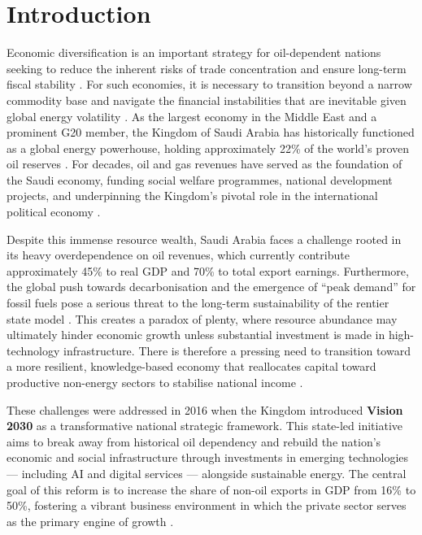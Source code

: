 \documentclass[12pt, a4paper]{article}
\begin{document}
\newpage
\thispagestyle{plain}
\tableofcontents

\newpage

\section{Introduction}

Economic diversification is an important strategy for oil-dependent nations seeking to reduce the inherent risks of trade concentration and ensure long-term fiscal stability \citep{touati2024}. For such economies, it is necessary to transition beyond a narrow commodity base and navigate the financial instabilities that are inevitable given global energy volatility \citep{alroubaie2025}. As the largest economy in the Middle East and a prominent G20 member, the Kingdom of Saudi Arabia has historically functioned as a global energy powerhouse, holding approximately 22\% of the world's proven oil reserves \citep{anser2020}. For decades, oil and gas revenues have served as the foundation of the Saudi economy, funding social welfare programmes, national development projects, and underpinning the Kingdom's pivotal role in the international political economy \citep{sallam2026}.

Despite this immense resource wealth, Saudi Arabia faces a challenge rooted in its heavy overdependence on oil revenues, which currently contribute approximately 45\% to real GDP and 70\% to total export earnings. Furthermore, the global push towards decarbonisation and the emergence of ``peak demand'' for fossil fuels pose a serious threat to the long-term sustainability of the rentier state model \citep{sallam2026}. This creates a paradox of plenty, where resource abundance may ultimately hinder economic growth unless substantial investment is made in high-technology infrastructure. There is therefore a pressing need to transition toward a more resilient, knowledge-based economy that reallocates capital toward productive non-energy sectors to stabilise national income \citep{alroubaie2025}.

These challenges were addressed in 2016 when the Kingdom introduced \textbf{Vision 2030} as a transformative national strategic framework. This state-led initiative aims to break away from historical oil dependency and rebuild the nation's economic and social infrastructure through investments in emerging technologies --- including AI and digital services --- alongside sustainable energy. The central goal of this reform is to increase the share of non-oil exports in GDP from 16\% to 50\%, fostering a vibrant business environment in which the private sector serves as the primary engine of growth \citep{touati2024}.
\end{document}

